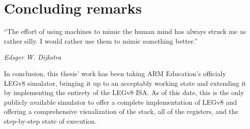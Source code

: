 \chapter*{Concluding remarks}
\label{chap:concl}

\epigraph{``The effort of using machines to mimic the human mind has always struck me as rather silly. I would rather use them to mimic something better.''}{\textit{Edsger W. Dijkstra}}

In conclusion, this thesis' work has been taking ARM Education's officialy LEGv8 simulator, bringing it up to an acceptably working state and extending it by implementing the entirety of the LEGv8 ISA. As of this date, this is the only publicly available simulator to offer a complete implementation of LEGv8 and offering a comprehensive visualization of the stack, all of the registers, and the step-by-step state of execution.

